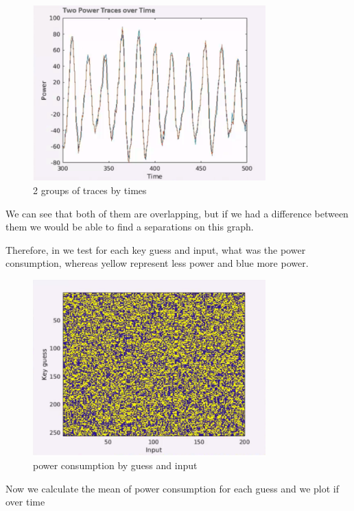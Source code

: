 \begin{figure}[!ht]
    \centering
    \includegraphics[width=0.8\textwidth]{images/Lecture6/2traces-by-time.png}
    \caption{2 groups of traces by times} \label{fig:2traces-by-time}
\end{figure}

We can see that both of them are overlapping, but if we had a difference between
them we would be able to find a separations on this graph.

Therefore, in  we test for each key guess and
input, what was the power consumption, whereas yellow represent less power and
blue more power.

\begin{figure}[!ht]
    \centering
    \includegraphics[width=0.8\textwidth]{images/Lecture6/intensity_by_guess.png}
    \caption{power consumption by guess and input} \label{fig:intensity_by_guess}
\end{figure}

Now we calculate the mean of power consumption for each guess and we plot if
over time

